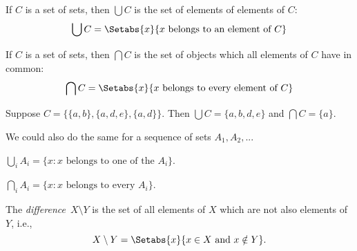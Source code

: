 \documentclass[../../include/open-logic-section]{subfiles}
\begin{document}
\begin{defn}
If $C$ is a set of sets, then $\bigcup C$ is the set of elements of
elements of $C$:
\[
\bigcup C = \Setabs{x}{x \text{ belongs to an element of } C}
\]
\end{defn}

\begin{defn}
If $C$ is a set of sets, then $\bigcap C$ is the set of objects which
all elements of $C$ have in common:
\[
\bigcap C = \Setabs{x}{x \text{ belongs to every element of } C}
\]
\end{defn}

\begin{ex}
Suppose $C = \{ \{ a, b \}, \{ a, d, e \}, \{ a, d \} \}$.
Then $\bigcup C = \{ a, b, d, e \}$ and $\bigcap C = \{ a \}$.
\end{ex}

We could also do the same for a sequence of sets $A_1, A_2, ... $

$\bigcup_i A_i = \{ x : x \text{ belongs to one of the } A_i \}$.

$\bigcap_i A_i = \{ x : x \text{ belongs to every } A_i \}$.

\begin{defn}
The \emph{difference}~$X \setminus Y$ is the set of all elements of
$X$ which are not also elements of~$Y$, i.e.,
\[
X\setminus Y = \Setabs{x}{x\in X \text{ and } x \notin Y}.
\]
\end{defn}
\end{document}
